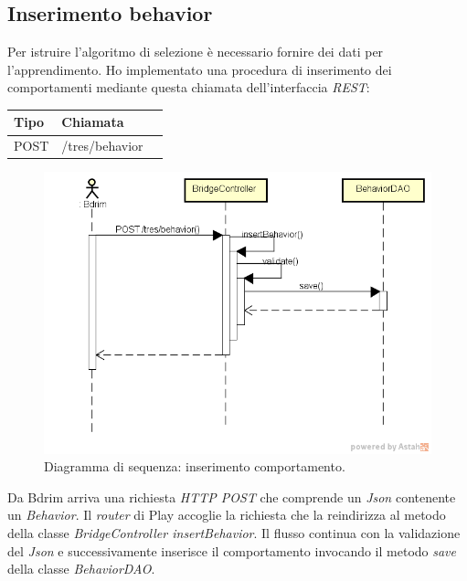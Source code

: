 \subsection{Inserimento behavior}
Per istruire l'algoritmo di selezione è necessario fornire dei dati per l'apprendimento. Ho implementato una procedura di inserimento dei comportamenti mediante questa chiamata dell'interfaccia \emph{REST}:
\def\arraystretch{1.5}
\begin{longtable}{|p{2.5cm}|p{5cm}|l|}
\hline
\textbf{Tipo} &	\textbf{Chiamata}	\\\hline
POST	&	/tres/behavior	 \\\hline
\end{longtable}
\begin{figure}[h]
\centering
\includegraphics[scale=0.42]{immagini/DSinsertBeh}
\caption{Diagramma di sequenza: inserimento comportamento.}
\label{fig:seq-inserimentobeh}
\end{figure}
Da Bdrim arriva una richiesta \emph{HTTP POST} che comprende un \emph{Json} contenente un \emph{Behavior}. Il \emph{router} di Play accoglie la richiesta che la reindirizza al metodo della classe \emph{BridgeController insertBehavior}. Il flusso continua con la validazione del \emph{Json} e successivamente inserisce il comportamento invocando il metodo \emph{save} della classe \emph{BehaviorDAO}. 


